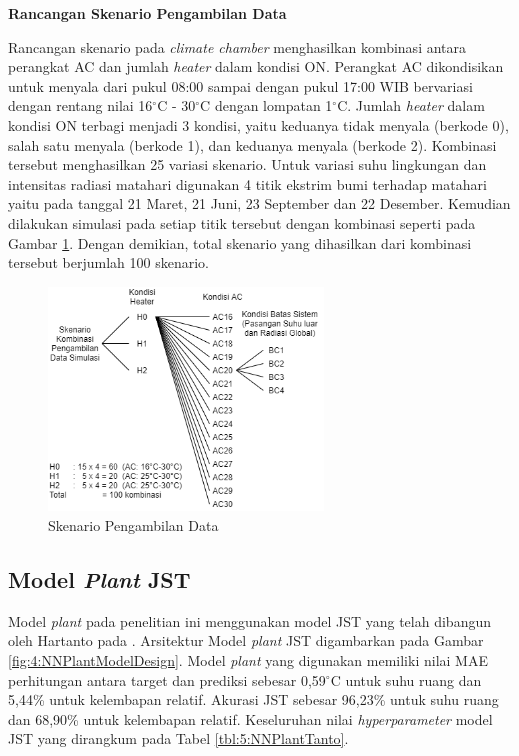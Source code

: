 \noindent\textbf{Rancangan Skenario Pengambilan Data}

Rancangan skenario pada \textit{climate chamber} menghasilkan kombinasi antara perangkat AC dan jumlah \textit{heater} dalam kondisi ON. Perangkat AC dikondisikan untuk menyala dari pukul 08:00 sampai dengan pukul 17:00 WIB bervariasi dengan rentang nilai 16$^\circ$C - 30$^\circ$C dengan lompatan 1$^\circ$C. Jumlah \textit{heater} dalam kondisi ON terbagi menjadi 3 kondisi, yaitu keduanya tidak menyala (berkode 0), salah satu menyala (berkode 1), dan keduanya menyala (berkode 2). Kombinasi tersebut menghasilkan 25 variasi skenario. Untuk variasi suhu lingkungan dan intensitas radiasi matahari digunakan 4 titik ekstrim bumi terhadap matahari yaitu pada tanggal 21 Maret, 21 Juni, 23 September dan 22 Desember. Kemudian dilakukan simulasi pada setiap titik tersebut dengan kombinasi seperti pada Gambar \ref{fig:4:SkenarioData}. Dengan demikian, total skenario yang dihasilkan dari kombinasi tersebut berjumlah 100 skenario.

\begin{figure}[!h]
	\centering
	\includegraphics[width=0.65\textwidth]{figures/SkenarioData}
	\caption{Skenario Pengambilan Data}
	\label{fig:4:SkenarioData}
\end{figure}
\vspace{1em}
\break
\break

\subsection{Model \textit{Plant} JST}
Model \textit{plant} pada penelitian ini menggunakan model JST yang telah dibangun oleh Hartanto pada \cite{skripsiTanto}. Arsitektur Model \textit{plant} JST digambarkan pada Gambar \ref{fig:4:NNPlantModelDesign}. Model \textit{plant} yang digunakan memiliki nilai MAE perhitungan antara target dan prediksi sebesar 0,59$^{\circ}$C untuk suhu ruang dan 5,44\% untuk kelembapan relatif. Akurasi JST sebesar 96,23\% untuk suhu ruang dan 68,90\% untuk kelembapan relatif. Keseluruhan nilai \textit{hyperparameter} model JST yang dirangkum pada Tabel \ref{tbl:5:NNPlantTanto}.

